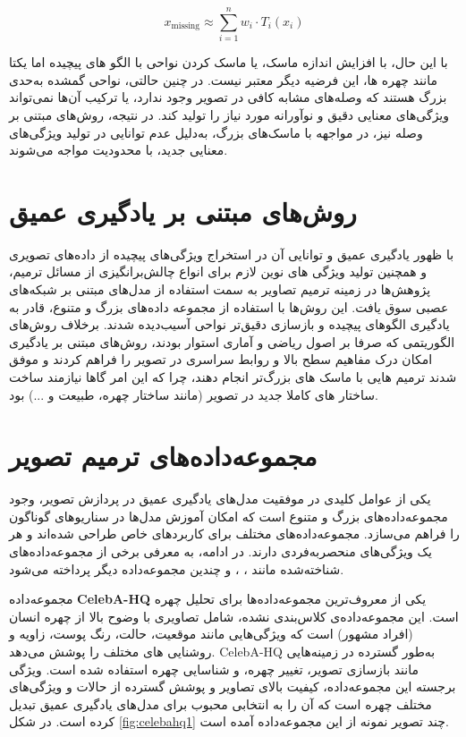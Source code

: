 $$
 x_{\text{missing}} \approx \sum_{i=1}^{n} w_i \cdot T_i(x_i)
 $$


با این حال، با افزایش اندازه ماسک، یا ماسک کردن نواحی با الگو های پیچیده اما یکتا مانند چهره ها، این فرضیه دیگر معتبر نیست. در چنین حالتی، نواحی گمشده به‌حدی بزرگ هستند که وصله‌های مشابه کافی در تصویر وجود ندارد، یا ترکیب آن‌ها نمی‌تواند ویژگی‌های معنایی دقیق و نوآورانه مورد نیاز را تولید کند. در نتیجه، روش‌های مبتنی بر وصله نیز، در مواجهه با ماسک‌های بزرگ، به‌دلیل عدم توانایی در تولید ویژگی‌های معنایی جدید، با محدودیت مواجه می‌شوند.

\section{روش‌های مبتنی بر یادگیری عمیق}

با ظهور یادگیری عمیق و توانایی آن در استخراج ویژگی‌های پیچیده از داده‌های تصویری و همچنین تولید ویژگی های نوین لازم برای انواع چالش‌برانگیزی از مسائل ترمیم، پژوهش‌ها در زمینه ترمیم تصاویر به سمت استفاده از مدل‌های مبتنی بر شبکه‌های عصبی سوق یافت. این روش‌ها با استفاده از مجموعه داده‌های بزرگ و متنوع، قادر به یادگیری الگوهای پیچیده و بازسازی دقیق‌تر نواحی آسیب‌دیده شدند. برخلاف روش‌های الگوریتمی که صرفا بر اصول ریاضی و آماری استوار بودند، روش‌های مبتنی بر یادگیری امکان درک مفاهیم سطح بالا و روابط سراسری در تصویر را فراهم کردند و موفق شدند ترمیم هایی با  ماسک های بزرگ‌تر انجام دهند، چرا که این امر گاها نیازمند ساخت ساختار های کاملا جدید در تصویر (مانند ساختار چهره، طبیعت و ...) بود. 

\section{مجموعه‌داده‌های ترمیم تصویر}

یکی از عوامل کلیدی در موفقیت مدل‌های یادگیری عمیق در پردازش تصویر، وجود مجموعه‌داده‌های بزرگ و متنوع است که امکان آموزش مدل‌ها در سناریوهای گوناگون را فراهم می‌سازد. مجموعه‌داده‌های مختلف برای کاربردهای خاص طراحی شده‌اند و هر یک ویژگی‌های منحصربه‌فردی دارند. در ادامه، به معرفی برخی از مجموعه‌داده‌های شناخته‌شده مانند ، ، و چندین مجموعه‌داده دیگر پرداخته می‌شود.


مجموعه‌داده \textbf{CelebA-HQ} یکی از معروف‌ترین مجموعه‌داده‌ها برای تحلیل چهره است. این مجموعه‌داده‌ی کلاس‌بندی نشده، شامل تصاویری با وضوح بالا از چهره انسان (افراد مشهور) است که ویژگی‌هایی مانند موقعیت، حالت، رنگ پوست، زاویه و روشنایی های مختلف را پوشش می‌دهد. CelebA-HQ به‌طور گسترده در زمینه‌هایی مانند بازسازی تصویر، تغییر چهره، و شناسایی چهره استفاده شده است. ویژگی برجسته این مجموعه‌داده، کیفیت بالای تصاویر و پوشش گسترده از حالات و ویژگی‌های مختلف چهره است که آن را به انتخابی محبوب برای مدل‌های یادگیری عمیق تبدیل کرده است. در شکل \ref{fig:celebahq1} چند تصویر نمونه از این مجموعه‌داده آمده است.

